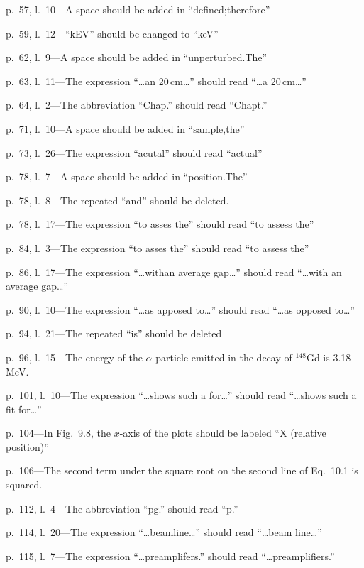  \item p.~57, l.~10---A space should be added in ``defined;therefore''
  \item p.~59, l.~12---``kEV'' should be changed to ``keV''
  \item p.~62, l.~9---A space should be added in ``unperturbed.The''
  \item p.~63, l.~11---The expression ``\ldots an 20\,cm\ldots'' should read ``\ldots a 20\,cm\ldots''
  \item p.~64, l.~2---The abbreviation ``Chap.'' should read ``Chapt.'' 
  \item p.~71, l.~10---A space should be added in ``sample,the''
  \item p.~73, l.~26---The expression ``acutal'' should read ``actual''
  \item p.~78, l.~7---A space should be added in ``position.The''
  \item p.~78, l.~8---The repeated ``and'' should be deleted.
  \item p.~78, l.~17---The expression ``to asses the'' should read ``to assess the'' 
  \item p.~84, l.~3---The expression ``to asses the'' should read ``to assess the'' 
	\item p.~86, l.~17---The expression ``\ldots withan average gap\ldots'' should read ``\ldots with an average gap\ldots''
	\item p.~90, l.~10---The expression ``\ldots as apposed to\ldots'' should read ``\ldots as opposed to\ldots''
	\item p.~94, l.~21---The repeated ``is'' should be deleted
	\item p.~96, l.~15---The energy of the $\alpha$-particle emitted in the decay of $^{148}$Gd is 3.18\,MeV.%
	\item p.~101, l.~10---The expression ``\ldots shows such a for\ldots'' should read ``\ldots shows such a fit for\ldots''
	\item p.~104---In Fig.~9.8, the $x$-axis of the plots should be labeled ``X (relative position)''
	\item p.~106---The second term under the square root on the second line of Eq.~10.1 is squared.
	\item p.~112, l.~4---The abbreviation ``pg.'' should read ``p.'' 
	\item p.~114, l.~20---The expression ``\ldots beamline\ldots'' should read ``\ldots beam line\ldots''
	\item p.~115, l.~7---The expression ``\ldots preamplifers.'' should read ``\ldots preamplifiers.''
